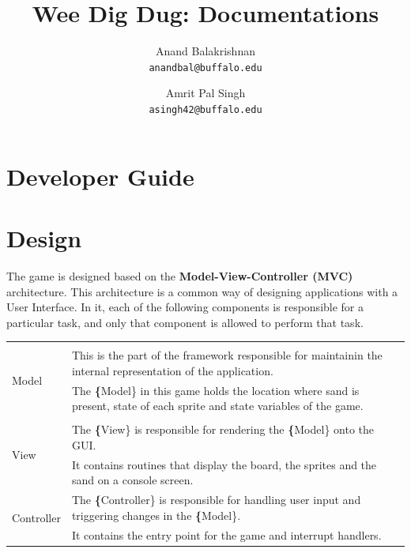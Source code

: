 

\rfoot{\thepage}

\author{
  Anand Balakrishnan \\ \texttt{anandbal@buffalo.edu}
  \and
  Amrit Pal Singh \\ \texttt{asingh42@buffalo.edu}
}
\title{Wee Dig Dug: Documentations}




  \maketitle
  \tableofcontents\newpage

  

\section{Developer Guide}

\section{Design}

The game is designed based on the \textbf{Model-View-Controller (MVC)} architecture.
This architecture is a common way of designing applications with a User Interface.
In it, each of the following components is responsible for a particular task, and only that component is allowed to perform that task.

\begin{table}[H]
  \centering
  \begin{tabularx}{\textwidth}{|p{3cm}|p{\textwidth -3cm}|}
    \hline \\
    \multirow{2}{*}{Model}  & This is the part of the framework responsible for maintainin the internal representation of the application.                      \\
                            & The \textbf\{Model\} in this game holds the location where sand is present, state of each sprite and state variables of the game. \\
    \hline \\

    \multirow{2}{*}{View}   & The \textbf\{View\} is responsible for rendering the \textbf\{Model\} onto the GUI. \\
                            & It contains routines that display the board, the sprites and the sand on a console screen.                                        \\
\multirow{2}{*}{Controller} & The \textbf\{Controller\} is responsible for handling user input and triggering changes in the \textbf\{Model\}.                  \\
                            & It contains the entry point for the game and interrupt handlers.                                                                 
\end{tabularx}
\end{table}



